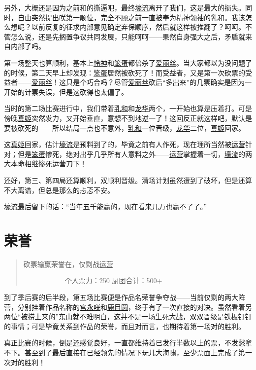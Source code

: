 另外，大概还是因为之前和的撕逼吧，最终\uline{壕流}离开了我们，这是最大的损失。同时，\uline{自由}突然提出\uline{咲}第一顺位，完全不顾之前一直被奉为精神领袖的\uline{乳和}。我该怎么想呢？以前反复的征求内部意见确定弃保顺序，然后就这样被推翻了？呵呵。不管怎么说，还是先搁置争议共同发展，只能呵呵——果然自身强大之后，矛盾就来自内部了吗。

第一场整天也算顺利，基本上\uline{怜神}和\uline{笨蛋}都倍杀了\uline{爱丽丝}。当大家都以为没问题了的时候，第二天早上却发现：\uline{笨蛋}居然被砍死了！而受益者，又是第一次砍票的受益者——\uline{爱丽丝}！这只是个巧合吗？尽管\uline{爱丽丝}砍后“多出来”的几票确实是因为一开始的计票失误，但是这砍得也太偏了。

当时的第二场比赛进行中，我们带着\uline{乳和}和\uline{龙华}两个，一开始也算是压着打。可是傍晚\uline{真姬}突然发力，又开始垂直，意想不到地逆一了！这回反正就这样吧，默认是要被砍死的——所以结局一点也不意外，\uline{乳和}一位晋级，\uline{龙华}二位，\uline{真姬}回家。

这\uline{真姬}回家，估计\uline{壕流}是预料到了的，毕竟之前有人作死，现在理所当然被\uline{运营}针对；但是\uline{笨蛋}惨死，绝对出乎几乎所有人意料之外——\uline{运营}掌握着一切，\uline{壕流}的两大本命相继惨死\uline{运营}刀下！

还好，第三、第四局还算顺利，双顺利晋级。清场计划虽然遭到了破坏，但是还算不大离谱，但总是那么的忐忑不安。

\uline{壕流}最后留下的话：“当年五千能赢的，现在看来几万也赢不了了。”

\chapter{荣誉}
\begin{quote}
砍票输赢荣誉在，仅剩战\uline{运营}

　　　　　　个人票力：250 厨团合计：500+
\end{quote}

到了季后赛的后半段，第五场比赛便是作品名荣誉争夺战——当前仅剩的两大阵营，分别挂着作品名称的\uline{宫永咲}和\uline{鹿目圆}，终于有了一次直接的对决。虽然看着另两位“被捞上来的”\uline{东山}就不难明白，这并不是一场生死大战，双双晋级是铁板钉钉的事情；可是毕竟关系到作品的荣誉，而且对而言，也期待着第一场对的胜利。

真正比赛的时候，倒是还感觉良好，一直都维持着已发行半数以上的票，不发愁拿不下。甚至到了最后直接在已经领先的情况下玩儿大海啸，至少票面上完成了第一次对的胜利！

